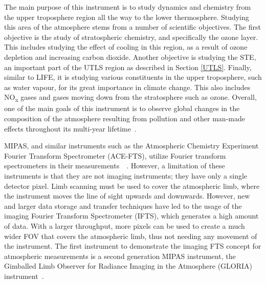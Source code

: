 The main purpose of this instrument is to study dynamics and chemistry from the upper troposphere region all the way to the lower thermosphere. Studying this area of the atmosphere stems from a number of scientific objectives. The first objective is the study of stratospheric chemistry, and specifically the ozone layer. This includes studying the effect of cooling in this region, as a result of ozone depletion and increasing carbon dioxide. Another objective is studying the STE, an important part of the UTLS region as described in Section \ref{UTLS}. Finally, similar to LIFE, it is studying various constituents in the upper troposphere, such as water vapour, for its great importance in climate change. This also includes NO\textsubscript{x} gases and gases moving down from the stratosphere such as ozone. Overall, one of the main goals of this instrument is to observe global changes in the composition of the atmosphere resulting from pollution and other man-made effects throughout its multi-year lifetime~\citep{MIPAS_instrument}.

MIPAS, and similar instruments such as the Atmospheric Chemistry Experiment Fourier Transform Spectrometer (ACE-FTS), utilize Fourier transform spectrometers in their measurements~\citep{SPARC}~\citep{ACE_conference}. However, a limitation of these instruments is that they are not imaging instruments; they have only a single detector pixel. Limb scanning must be used to cover the atmospheric limb, where the instrument moves the line of sight upwards and downwards. However, new and larger data storage and transfer techniques have led to the usage of the imaging Fourier Transform Spectrometer (IFTS), which generates a high amount of data. With a larger throughput, more pixels can be used to create a much wider FOV that covers the atmospheric limb, thus not needing any movement of the instrument. The first instrument to demonstrate the imaging FTS concept for atmospheric measurements is a second generation MIPAS instrument, the Gimballed Limb Observer for Radiance Imaging in the Atmosphere (GLORIA) instrument~\citep{GLORIA_concept}.

